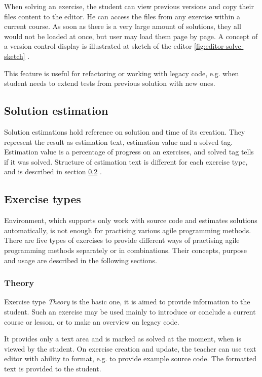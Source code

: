         When solving an exercise, the student can view previous versions and copy their files content to the editor. He can access the files from any exercise within a current course. As soon as there is a very large amount of solutions, they all would not be loaded at once, but user may load them page by page. A concept of a version control display is illustrated at sketch of the editor \ref{fig:editor-solve-sketch} .
        
        This feature is useful for refactoring or working with legacy code, e.g. when student needs to extend tests from previous solution with new ones.
        
        \subsection{Solution estimation}
        Solution estimations hold reference on solution and time of its creation. They represent the result as estimation text, estimation value and a solved tag. Estimation value is a percentage of progress on an exercises, and solved tag tells if it was solved. Structure of estimation text is different for each exercise type, and is described in section \ref{subsec:exercise-types} .

        \subsection{Exercise types}
        \label{subsec:exercise-types}
        Environment, which supports only work with source code and estimates solutions automatically, is not enough for practising various agile programming methods. There are five types of exercises to provide different ways of practising agile programming methods separately or in combinations. Their concepts, purpose and usage are described in the following sections.
            
            \subsubsection{Theory}
            Exercise type \textit{Theory} is the basic one, it is aimed to provide information to the student. Such an exercise may be used mainly to introduce or conclude a current course or lesson, or to make an overview on legacy code.
            
            It provides only a text area and is marked as solved at the moment, when is viewed by the student. On exercise creation and update, the teacher can use text editor with ability to format, e.g. to provide example source code. The formatted text is provided to the student.
        

